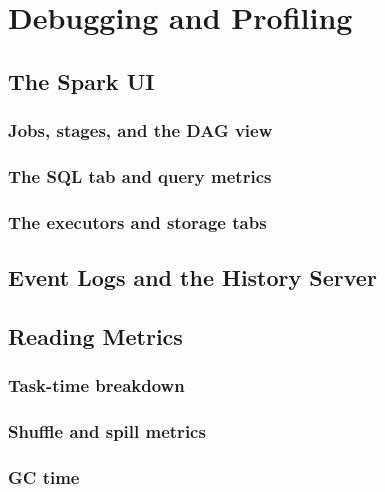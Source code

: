 \chapter{Debugging and Profiling}
\label{ch:debugging}

\tbd


\section{The Spark UI}
\label{sec:dbg-ui}

\subsection{Jobs, stages, and the DAG view}
\tbd

\subsection{The SQL tab and query metrics}
\tbd

\subsection{The executors and storage tabs}
\tbd

\section{Event Logs and the History Server}
\label{sec:dbg-history}
\tbd

\section{Reading Metrics}
\label{sec:dbg-metrics}

\subsection{Task-time breakdown}
\tbd

\subsection{Shuffle and spill metrics}
\tbd

\subsection{GC time}
\tbd

